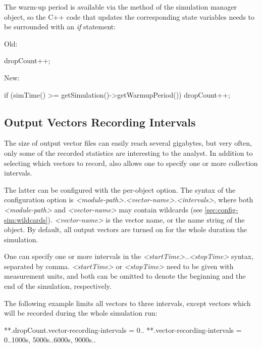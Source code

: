 The warm-up period is available via the  method of
the simulation manager object, so the C++ code that updates the corresponding
state variables needs to be surrounded with an \textit{if} statement:

Old:

\begin{cpp}
dropCount++;
\end{cpp}

New:

\begin{cpp}
if (simTime() >= getSimulation()->getWarmupPeriod())
    dropCount++;
\end{cpp}


\subsection{Output Vectors Recording Intervals}
\label{sec:ana-sim:vector-recording-intervals}

The size of output vector files can easily reach several gigabytes,
but very often, only some of the recorded statistics are
interesting to the analyst. In addition to selecting which vectors to
record, {\opp} also allows one to specify one or more collection intervals.

The latter can be configured with the 
per-object option. The syntax of the configuration option is
\textit{<module-path>.<vector-name>.}\textit{<intervals>},
where both \textit{<module-path>} and \textit{<vector-name>} may
contain wildcards (see \ref{sec:config-sim:wildcards}).
\textit{<vector-name>} is the vector name, or the name string of the
 object. By default, all output vectors are turned
on for the whole duration the simulation.

One can specify one or more intervals in the \textit{<startTime>..<stopTime>}
syntax, separated by comma. \textit{<startTime>} or \textit{<stopTime>} need
to be given with measurement units, and both can be omitted to denote
the beginning and the end of the simulation, respectively.

The following example limits all vectors to three intervals, except
 vectors which will be recorded during the whole
simulation run:

\begin{inifile}
**.dropCount.vector-recording-intervals = 0..
**.vector-recording-intervals = 0..1000s, 5000s..6000s, 9000s..
\end{inifile}

